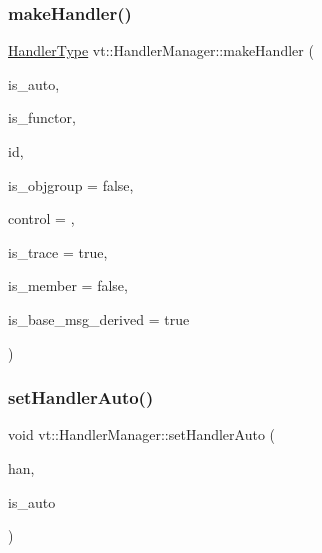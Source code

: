 \mbox{\label{structvt_1_1_handler_manager_a6526360e284ab5dab5c95be3668b21d0}} 
\subsubsection{\texorpdfstring{make\+Handler()}{makeHandler()}}
{\footnotesize\ttfamily \hyperlink{namespacevt_af64846b57dfcaf104da3ef6967917573}{Handler\+Type} vt\+::\+Handler\+Manager\+::make\+Handler (\begin{DoxyParamCaption}\item[{bool}]{is\+\_\+auto,  }\item[{bool}]{is\+\_\+functor,  }\item[{\hyperlink{namespacevt_a59ae068fe828d1c33051ff96f3d016b6}{Handler\+Identifier\+Type}}]{id,  }\item[{bool}]{is\+\_\+objgroup = {\ttfamily false},  }\item[{\hyperlink{namespacevt_adbbef13b92f0a93b14c219b7cc8a48f2}{Handler\+Control\+Type}}]{control = {},  }\item[{bool}]{is\+\_\+trace = {\ttfamily true},  }\item[{bool}]{is\+\_\+member = {\ttfamily false},  }\item[{bool}]{is\+\_\+base\+\_\+msg\+\_\+derived = {\ttfamily true} }\end{DoxyParamCaption})\hspace{0.3cm}{\ttfamily [static]}}

\mbox{\label{structvt_1_1_handler_manager_a9100f9e0e946b58d98d104a5cbcf5574}} 
\subsubsection{\texorpdfstring{set\+Handler\+Auto()}{setHandlerAuto()}}
{\footnotesize\ttfamily void vt\+::\+Handler\+Manager\+::set\+Handler\+Auto (\begin{DoxyParamCaption}\item[{\hyperlink{namespacevt_af64846b57dfcaf104da3ef6967917573}{Handler\+Type} \&}]{han,  }\item[{bool}]{is\+\_\+auto }\end{DoxyParamCaption})\hspace{0.3cm}{\ttfamily [static]}}

